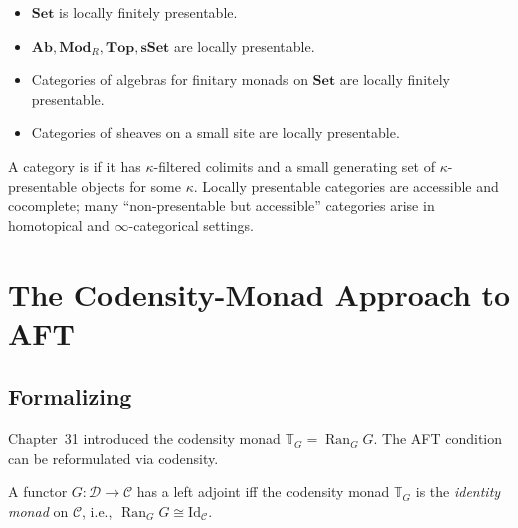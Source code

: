 \begin{example_thm}
\begin{itemize}
  \item $\mathbf{Set}$ is locally finitely presentable.
  \item $\mathbf{Ab}, \mathbf{Mod}_R, \mathbf{Top}, \mathbf{sSet}$ are
        locally presentable.
  \item Categories of algebras for finitary monads on $\mathbf{Set}$ are
        locally finitely presentable.
  \item Categories of sheaves on a small site are locally presentable.
\end{itemize}
\end{example_thm}

\begin{theorem}
\label{thm:accessible}
A category is  if it has $\kappa$-filtered colimits and a
small generating set of $\kappa$-presentable objects for some $\kappa$.
Locally presentable categories are accessible and cocomplete; many
``non-presentable but accessible'' categories arise in homotopical and
$\infty$-categorical settings.
\end{theorem}


\section{The Codensity-Monad Approach to AFT}
\label{sec:codensity-aft}

\subsection{Formalizing}

Chapter~31 introduced the codensity monad $\mathbb{T}_G = \operatorname{Ran}_G G$.
The AFT condition can be reformulated via codensity.

\begin{theorem}
\label{thm:adj-via-codensity}
A functor $G : \mathcal{D} \to \mathcal{C}$ has a left adjoint iff the
codensity monad $\mathbb{T}_G$ is the \emph{identity monad} on
$\mathcal{C}$, i.e., $\operatorname{Ran}_G G \cong \mathrm{Id}_\mathcal{C}$.
\end{theorem}

